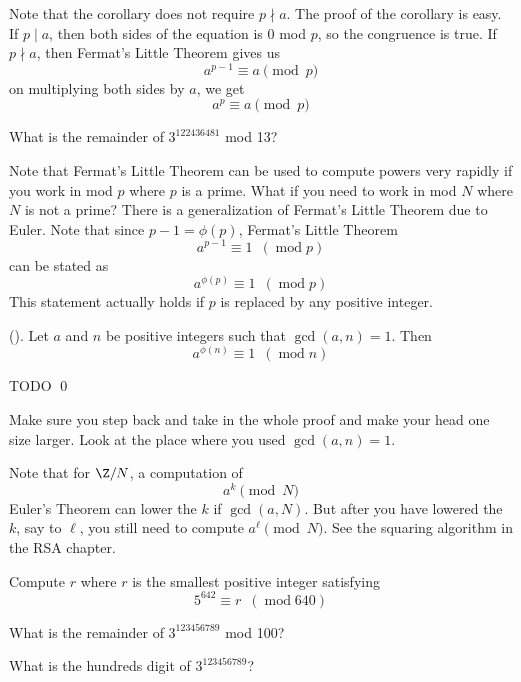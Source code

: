 Note that the corollary does not require $p \nmid a$.
The proof of the corollary is easy.
If $p \mid a$, then both sides of the equation is $0$ mod $p$,
so the congruence is true.
If $p \nmid a$, then Fermat's Little Theorem gives us
\[
a^{p-1} \equiv a \pmod{p}
\]
on multiplying both sides by $a$, we get
\[
a^p \equiv a \pmod{p}
\]

\begin{ex}
What is the remainder of $3^{122436481}$ mod 13?
\end{ex}


Note that Fermat's Little Theorem can be used to compute powers
very rapidly if you work in mod $p$ where $p$ is a prime. What if
you need to work in mod $N$ where $N$ is not a prime? There is a
generalization of Fermat's Little Theorem due to Euler. Note that
since $p-1 = \phi(p)$, Fermat's Little Theorem
\[
 a^{p-1} \equiv 1 \,\,\,(\operatorname{mod} p)
\]
can be stated as
\[
 a^{\phi(p)} \equiv 1 \,\,\,(\operatorname{mod} p)
\]
This statement actually holds if $p$ is replaced by any positive
integer.

\begin{thm} \textnormal{()}.
  Let $a$ and $n$ be positive integers such that $\gcd(a, n) = 1$.
  Then
  \[
  a^{\phi(n)} \equiv 1 \,\,\,(\operatorname{mod} n)
  \]
\end{thm}
\proof
TODO
\qed

Make sure you step back and take in the whole proof and make your
head one size larger. Look at the place where you used
$\gcd(a,n)=1$.

Note that for $\Z/N$, a computation of
\[
a^k \pmod{N}
\]
Euler's Theorem can lower the $k$ if $\gcd(a, N)$.
But after you have lowered the $k$, say to $\ell$,
you still need to compute $a^\ell \pmod{N}$.
See the squaring algorithm in the RSA chapter.



\begin{ex}
Compute $r$ where $r$ is the smallest positive integer satisfying
\[
 5^{642} \equiv r \,\,\,(\operatorname{mod} 640)
\]
\end{ex}


\begin{ex}
What is the remainder of $3^{123456789}$ mod 100?
\end{ex}

\begin{ex}
What is the hundreds digit of $3^{123456789}$?
\end{ex}

